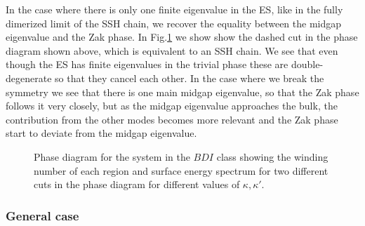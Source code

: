 \documentclass[twocolumn,amsmath,longbibliography,amssymb,superscriptaddress]{revtex4-1}
\begin{document}
In the case where there is only one finite eigenvalue in  the ES, like in the fully dimerized limit of the SSH chain, we recover the equality between the midgap eigenvalue and the Zak phase. In Fig.\ref{huang} we show show the dashed cut in the phase diagram shown above, which is equivalent to an SSH chain. We see that even though the ES has finite eigenvalues in the trivial phase these are double-degenerate so that they cancel each other. In the case where we break the symmetry we see that there is one main midgap eigenvalue, so that the Zak phase follows it very closely, but as the midgap eigenvalue approaches the bulk, the contribution from the other modes becomes more relevant and the Zak phase start to deviate from the midgap eigenvalue.
\begin{figure}[h!]
\centering
{}
\caption{Phase diagram for the system in the $BDI$ class showing the winding number of each region and surface energy spectrum for two different cuts in the phase diagram for different values of $\kappa,\kappa'$.}
\label{huang}
\end{figure}

\subsubsection{General case}
\end{document}
